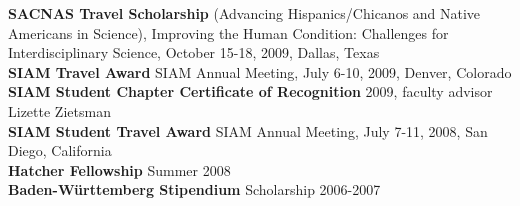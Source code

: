 \documentclass[10pt]{article}
\newenvironment{outerlist}[1][\enskip\textbullet]%
          {\begin{enumerate}[#1]}{\end{enumerate}%
           \vspace{-.6\baselineskip}}
\begin{document}
  \textbf{SACNAS Travel Scholarship} (Advancing Hispanics/Chicanos and Native Americans
  in Science), Improving the Human Condition: Challenges for Interdisciplinary
  Science, October 15-18, 2009, Dallas, Texas \\

  \textbf{SIAM Travel Award} SIAM Annual Meeting, July 6-10, 2009, Denver, Colorado \\

  \textbf{SIAM Student Chapter Certificate of Recognition} 2009, faculty advisor Lizette Zietsman \\

  \textbf{SIAM Student Travel Award} SIAM Annual Meeting, July
  7-11, 2008, San Diego, California \\

  \textbf{Hatcher Fellowship} Summer 2008 \\

  \textbf{Baden-W\"urttemberg Stipendium} Scholarship 2006-2007 \\

\end{document}
